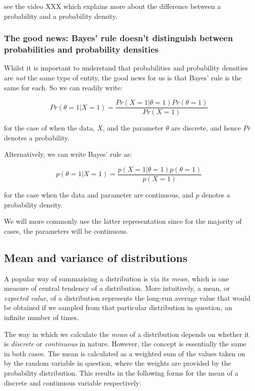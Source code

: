 \documentclass[11pt,fullpage]{book}
\begin{document}
 see the video XXX which explains more about the difference between a probability and a probability density.

\subsubsection{The good news: Bayes' rule doesn't distinguish between probabilities and probability densities}
Whilst it is important to understand that probabilities and probability densities are \textit{not} the same type of entity, the good news for us is that Bayes' rule is the same for each. So we can readily write:

\begin{equation}
Pr(\theta=1|X=1) = \frac{Pr(X=1|\theta=1)Pr(\theta=1)}{Pr(X=1)}
\end{equation}

for the case of when the data, $X$, and the parameter $\theta$ are discrete, and hence $Pr$ denotes a probability.

Alternatively, we can write Bayes' rule as:

\begin{equation}
p(\theta=1|X=1) = \frac{p(X=1|\theta=1)p(\theta=1)}{p(X=1)}
\end{equation}

for the case when the data and parameter are continuous, and $p$ denotes a probability density.

We will more commonly use the latter representation since for the majority of cases, the parameters will be continuous.

\subsection{Mean and variance of distributions}\label{sec:Probability_meanVariance}
A popular way of summarising a distribution is via its \textit{mean}, which is one measure of central tendency of a distribution. More intuitively, a mean, or \textit{expected value}, of a distribution represents the long-run average value that would be obtained if we sampled from that particular distribution in question, an infinite number of times. 

The way in which we calculate the \textit{mean} of a distribution depends on whether it is \textit{discrete} or \textit{continuous} in nature. However, the concept is essentially the same in both cases. The mean is calculated as a weighted sum of the values taken on by the random variable in question, where the weights are provided by the probability distribution. This results in the following forms for the mean of a discrete and continuous variable respectively:
\end{document}
